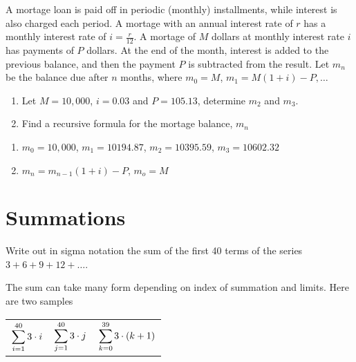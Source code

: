 \begin{questions}
 A mortage loan is paid off in periodic (monthly) installments, while interest is also charged each period.  A mortage with an annual interest rate of $r$ has a monthly interest rate of $i = \frac{r}{12}$.  A mortage of $M$ dollars at monthly interest rate $i$ has payments of $P$ dollars.  At the end of the month, interest is added to the previous balance, and then the payment $P$ is subtracted from the result.  Let $m_n$ be the balance due after $n$ months, where $m_0 = M$, $m_1 = M(1+i) - P, \ldots$
\begin{enumerate}[label=(\alph*),itemsep=0pt,parsep=0pt,
    topsep=0pt,partopsep=0pt]
    \item Let $M = 10,000$, $i = 0.03$ and $P = 105.13$, determine $m_2$ and $m_3$.
    \item Find a recursive formula for the mortage balance, $m_n$
\end{enumerate}
    \ifprintanswers
        \vspace{-10pt}
   \fi
\begin{solution}
    \begin{enumerate}[label=(\alph*),itemsep=0pt,parsep=0pt,
    topsep=0pt,partopsep=0pt]
        \item $m_0 = 10,000$, $m_1 = 10194.87$, $m_2 = 10395.59$, $m_3 =  10602.32$
        \item $m_n = m_{n-1}(1+i) - P$, $m_o = M$
    \end{enumerate}
\end{solution}


\section*{Summations}


 Write out in sigma notation the sum of the first 40 terms of the series $3 + 6 + 9 + 12 + \ldots$.
    \ifprintanswers
        \vspace{-10pt}
   \fi
\begin{solution}
    The sum can take many form depending on index of summation and limits.  Here are two samples

\begin{center}
\begin{tabular}{ccc}
   $\displaystyle \sum_{i=1}^{40} 3\cdot i$ \hspace{0.25in} & $\displaystyle \sum_{j=1}^{40} 3\cdot j$ \hspace{0.25in} &
    $\displaystyle \sum_{k=0}^{39} 3\cdot (k+1)$
\end{tabular}
\end{center}
\end{solution}



\end{questions}
